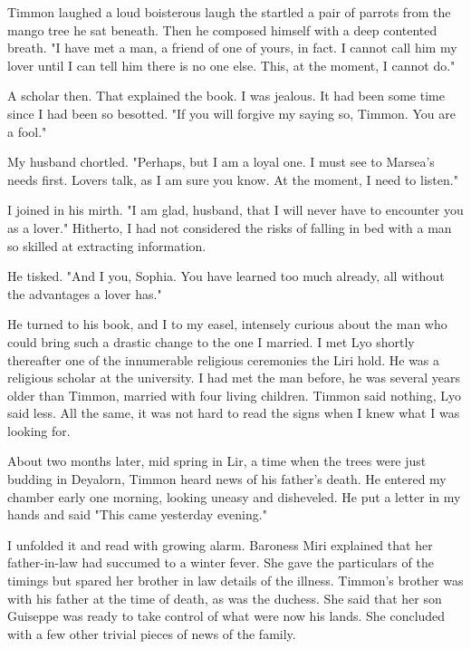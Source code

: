 \documentclass{article}
\begin{document}
Timmon laughed a loud boisterous laugh the startled a pair of parrots from the mango tree he sat beneath. Then he composed himself with a deep contented breath. "I have met a man, a friend of one of yours, in fact. I cannot call him my lover until I can tell him there is no one else. This, at the moment, I cannot do."

A scholar then. That explained the book. I was jealous. It had been some time since I had been so besotted. "If you will forgive my saying so, Timmon. You are a fool."

My husband chortled. "Perhaps, but I am a loyal one. I must see to Marsea's needs first. Lovers talk, as I am sure you know. At the moment, I need to listen."

I joined in his mirth. "I am glad, husband, that I will never have to encounter you as a lover." Hitherto, I had not considered the risks of falling in bed with a man so skilled at extracting information.

He tisked. "And I you, Sophia. You have learned too much already, all without the advantages a lover has."

He turned to his book, and I to my easel, intensely curious about the man who could bring such a drastic change to the one I married. I met Lyo shortly thereafter one of the innumerable religious ceremonies the Liri hold. He was a religious scholar at the university. I had met the man before, he was several years older than Timmon, married with four living children. Timmon said nothing, Lyo said less. All the same, it was not hard to read the signs when I knew what I was looking for.

\vspace{.5cm}

About two months later, mid spring in Lir, a time when the trees were just budding in Deyalorn, Timmon heard news of his father's death. He entered my chamber early one morning, looking uneasy and disheveled. He put a letter in my hands and said "This came yesterday evening."

I unfolded it and read with growing alarm. Baroness Miri explained that her father-in-law had succumed to a winter fever. She gave the particulars of the timings but spared her brother in law details of the illness. Timmon's brother was with his father at the time of death, as was the duchess. She said that her son Guiseppe was ready to take control of what were now his lands. She concluded with a few other trivial pieces of news of the family.
\end{document}

